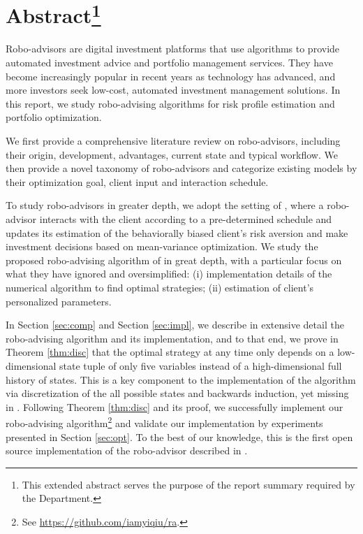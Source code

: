 \chapter*{Abstract\footnote{This extended abstract serves the purpose of the report summary required by the Department.}}

Robo-advisors are digital investment platforms that use algorithms to provide automated investment advice and portfolio management services. They have become increasingly popular in recent years as technology has advanced, and more investors seek low-cost, automated investment management solutions. In this report, we study robo-advising algorithms for risk profile estimation and portfolio optimization.

We first provide a comprehensive literature review on robo-advisors, including their origin, development, advantages, current state and typical workflow. We then provide a novel taxonomy of robo-advisors and categorize existing models by their optimization goal, client input and interaction schedule.

To study robo-advisors in greater depth, we adopt the setting of , where a robo-advisor interacts with the client according to a pre-determined schedule and updates its estimation of the behaviorally biased client's risk aversion and make investment decisions based on mean-variance optimization. We study the proposed robo-advising algorithm of  in great depth, with a particular focus on what they have ignored and oversimplified: (i) implementation details of the numerical algorithm to find optimal strategies; (ii) estimation of client's personalized parameters.

In Section \ref{sec:comp} and Section \ref{sec:impl}, we describe in extensive detail the robo-advising algorithm and its implementation, and to that end, we prove in Theorem \ref{thm:disc} that the optimal strategy at any time only depends on a low-dimensional state tuple of only five variables instead of a high-dimensional full history of states. This is a key component to the implementation of the algorithm via discretization of the all possible states and backwards induction, yet missing in . Following Theorem \ref{thm:disc} and its proof, we successfully implement our robo-advising algorithm\footnote{See \url{https://github.com/iamyiqiu/ra}.} and validate our implementation by experiments presented in Section \ref{sec:opt}. To the best of our knowledge, this is the first open source implementation of the robo-advisor described in .

